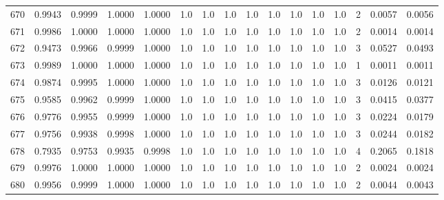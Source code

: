 \begin{tabular}{lrrrrrrrrrrrrrrr}
670 &      0.9943 &  0.9999 &  1.0000 &  1.0000 &     1.0 &     1.0 &     1.0 &     1.0 &     1.0 &     1.0 &      1.0 &        1.0 &      2 &                    0.0057 &                     0.0056 \\
671 &      0.9986 &  1.0000 &  1.0000 &  1.0000 &     1.0 &     1.0 &     1.0 &     1.0 &     1.0 &     1.0 &      1.0 &        1.0 &      2 &                    0.0014 &                     0.0014 \\
672 &      0.9473 &  0.9966 &  0.9999 &  1.0000 &     1.0 &     1.0 &     1.0 &     1.0 &     1.0 &     1.0 &      1.0 &        1.0 &      3 &                    0.0527 &                     0.0493 \\
673 &      0.9989 &  1.0000 &  1.0000 &  1.0000 &     1.0 &     1.0 &     1.0 &     1.0 &     1.0 &     1.0 &      1.0 &        1.0 &      1 &                    0.0011 &                     0.0011 \\
674 &      0.9874 &  0.9995 &  1.0000 &  1.0000 &     1.0 &     1.0 &     1.0 &     1.0 &     1.0 &     1.0 &      1.0 &        1.0 &      3 &                    0.0126 &                     0.0121 \\
675 &      0.9585 &  0.9962 &  0.9999 &  1.0000 &     1.0 &     1.0 &     1.0 &     1.0 &     1.0 &     1.0 &      1.0 &        1.0 &      3 &                    0.0415 &                     0.0377 \\
676 &      0.9776 &  0.9955 &  0.9999 &  1.0000 &     1.0 &     1.0 &     1.0 &     1.0 &     1.0 &     1.0 &      1.0 &        1.0 &      3 &                    0.0224 &                     0.0179 \\
677 &      0.9756 &  0.9938 &  0.9998 &  1.0000 &     1.0 &     1.0 &     1.0 &     1.0 &     1.0 &     1.0 &      1.0 &        1.0 &      3 &                    0.0244 &                     0.0182 \\
678 &      0.7935 &  0.9753 &  0.9935 &  0.9998 &     1.0 &     1.0 &     1.0 &     1.0 &     1.0 &     1.0 &      1.0 &        1.0 &      4 &                    0.2065 &                     0.1818 \\
679 &      0.9976 &  1.0000 &  1.0000 &  1.0000 &     1.0 &     1.0 &     1.0 &     1.0 &     1.0 &     1.0 &      1.0 &        1.0 &      2 &                    0.0024 &                     0.0024 \\
680 &      0.9956 &  0.9999 &  1.0000 &  1.0000 &     1.0 &     1.0 &     1.0 &     1.0 &     1.0 &     1.0 &      1.0 &        1.0 &      2 &                    0.0044 &                     0.0043 \\

\end{tabular}
